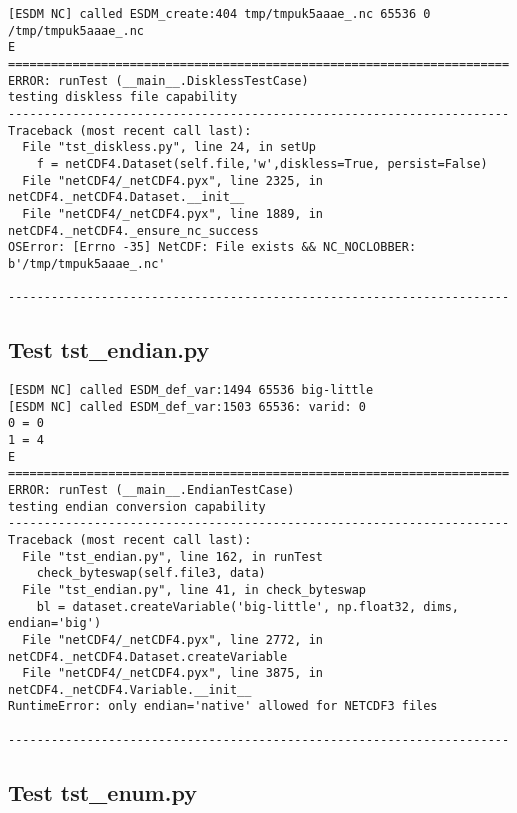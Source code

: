 \begin{verbatim}
[ESDM NC] called ESDM_create:404 tmp/tmpuk5aaae_.nc 65536 0 /tmp/tmpuk5aaae_.nc
E
======================================================================
ERROR: runTest (__main__.DisklessTestCase)
testing diskless file capability
----------------------------------------------------------------------
Traceback (most recent call last):
  File "tst_diskless.py", line 24, in setUp
    f = netCDF4.Dataset(self.file,'w',diskless=True, persist=False)
  File "netCDF4/_netCDF4.pyx", line 2325, in netCDF4._netCDF4.Dataset.__init__
  File "netCDF4/_netCDF4.pyx", line 1889, in netCDF4._netCDF4._ensure_nc_success
OSError: [Errno -35] NetCDF: File exists && NC_NOCLOBBER: b'/tmp/tmpuk5aaae_.nc'

----------------------------------------------------------------------
\end{verbatim}

\subsection{Test tst\_endian.py}

\begin{verbatim}
[ESDM NC] called ESDM_def_var:1494 65536 big-little
[ESDM NC] called ESDM_def_var:1503 65536: varid: 0
0 = 0
1 = 4
E
======================================================================
ERROR: runTest (__main__.EndianTestCase)
testing endian conversion capability
----------------------------------------------------------------------
Traceback (most recent call last):
  File "tst_endian.py", line 162, in runTest
    check_byteswap(self.file3, data)
  File "tst_endian.py", line 41, in check_byteswap
    bl = dataset.createVariable('big-little', np.float32, dims, endian='big')
  File "netCDF4/_netCDF4.pyx", line 2772, in netCDF4._netCDF4.Dataset.createVariable
  File "netCDF4/_netCDF4.pyx", line 3875, in netCDF4._netCDF4.Variable.__init__
RuntimeError: only endian='native' allowed for NETCDF3 files

----------------------------------------------------------------------
\end{verbatim}

\subsection{Test tst\_enum.py}


